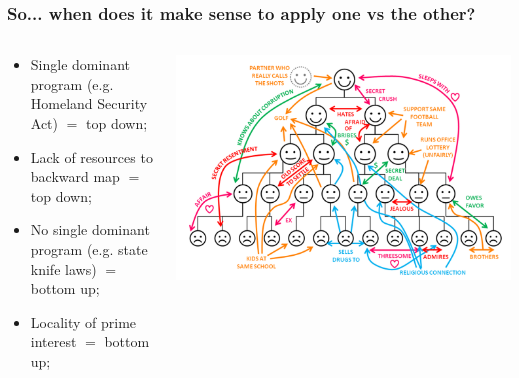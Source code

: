 \documentclass[aspectratio=169]{beamer}
\theoremstyle{principle}
\begin{document}
\begin{frame}
\frametitle{So... when does it make sense to apply one vs the other?}
\begin{columns}
\begin{column}{0.5\textwidth}

\begin{itemize}
\item Single dominant program (e.g. Homeland Security Act) $=$ top down;
\bigskip
\bigskip
\item Lack of resources to backward map $=$ top down;
\bigskip
\bigskip
\item No single dominant program (e.g. state knife laws) $=$ bottom up;
\bigskip
\bigskip
\item Locality of prime interest $=$ bottom up;
\end{itemize}
\end{column}
\begin{column}{0.5\textwidth}
    \begin{center}
     \includegraphics[scale=0.12]{top_down.png}
     \end{center}

\end{column}
\end{columns}

\end{frame}
\end{document}
